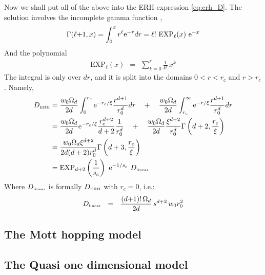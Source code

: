 Now we shall put all of the above into the ERH expression \ref{eq:erh_D}.
The solution involves the incomplete gamma function \cite{gamma},
%
\begin{align}
\Gamma(\ell{+}1,x) = \int_0^x r^{\ell} \mbox{e}^{-r} dr = 
\ell! \ \mbox{EXP}_{\ell}(x)  \ \mbox{e}^{-x}
\end{align}
%
And the polynomial
%
\begin{align}
\mathrm{EXP}_{\ell}(x) \ \ = \ \ \sum_{k=0}^{\ell} \frac{1}{k!} \, x^k
\end{align}
% 
The integral is only over $dr$, and it is split  
into the domains ${0<r<r_c}$ and ${r>r_c}$. 
Namely, 
%
\begin{align}
D_{\tbox{ERH}} &= 
\frac{w_0\Omega_d}{2d}\int_0^{r_c} \eexp{-r_c / \xi} \frac{r^{d+1}}{r_0^d} dr 
\nonumber 
\quad+\quad \frac{w_0\Omega_d}{2d}\int_{r_c}^\infty \eexp{-r / \xi} \frac{r^{d+1}}{r_0^d} dr 
\nonumber \\
&= \frac{w_0\Omega_d}{2d} \eexp{-r_c / \xi} \frac{r_c^{d+2}}{d+2} \frac{1}{r_0^d}
\nonumber 
\quad+\quad \frac{w_0\Omega_d}{2d} \frac{\xi^{d+2}}{r_0^d} \Gamma\left(d+2,\frac{r_c}{\xi}\right)
\nonumber \\
&= \frac{w_0\Omega_d \xi^{d+2}}{2d(d+2)r_0^d}\Gamma\left(d+3,\frac{r_c}{\xi}\right)\\
&= \mathrm{EXP}_{d{+}2}\left(\frac{1}{s_c}\right)  \  \eexp{-1/s_c}  \ D_{\tbox{linear}}
\end{align}
%
Where $D_{\mbox{\tiny linear}}$ is formally $D_{\mbox{\tiny ERH}}$ with $r_c=0$, i.e.:
%
\begin{align}
D_{\mbox{\tiny linear}} \ \ = \ \  
\frac{(d{+}1)!\,\Omega_d}{2d} \, s^{d{+}2} \, w_0 r_0^2
\end{align}



\subsection{The Mott hopping model}

\subsection{The Quasi one dimensional model}






